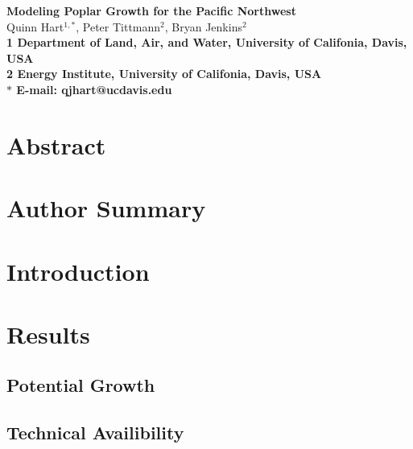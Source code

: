 \documentclass[10pt]{article}
\date{}
\begin{document}
\begin{flushleft}
{\Large
\textbf{Modeling Poplar Growth for the Pacific Northwest}
}
\\
Quinn Hart$^{1,\ast}$, 
Peter Tittmann$^{2}$, 
Bryan Jenkins$^{2}$
\\
\bf{1} Department of Land, Air, and Water, University of Califonia, Davis, USA
\\
\bf{2} Energy Institute, University of Califonia, Davis, USA
\\
$\ast$ E-mail: qjhart@ucdavis.edu
\end{flushleft}

\section*{Abstract}

\section*{Author Summary}

\section*{Introduction}

\section*{Results}
\subsection*{Potential Growth}
\subsection*{Technical Availibility}


\end{document}
